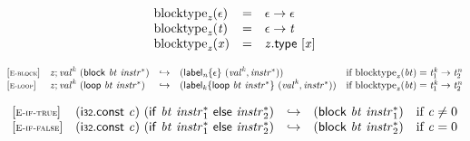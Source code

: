 \vspace{1ex}

$$
\begin{array}{@{}lcl@{}l@{}}
{{\mathrm{blocktype}}}_{{\mathit{z}}}(\epsilon) &=& \epsilon \rightarrow \epsilon &  \\
{{\mathrm{blocktype}}}_{{\mathit{z}}}({\mathit{t}}) &=& \epsilon \rightarrow {\mathit{t}} &  \\
{{\mathrm{blocktype}}}_{{\mathit{z}}}({\mathit{x}}) &=& {\mathit{z}}.\mathsf{type}~{}[{\mathit{x}}] &  \\
\end{array}
$$

$$
\begin{array}{@{}l@{}lcl@{}l@{}}
{[\textsc{\scriptsize E{-}block}]} \quad & {\mathit{z}} ; {{\mathit{val}}^{{\mathit{k}}}}~(\mathsf{block}~{\mathit{bt}}~{{\mathit{instr}}^\ast}) &\hookrightarrow& ({{\mathsf{label}}_{{\mathit{n}}}}{\{\epsilon\}}~({{\mathit{val}}^{{\mathit{k}}}}, {{\mathit{instr}}^\ast})) &\quad
  \mbox{if}~{{\mathrm{blocktype}}}_{{\mathit{z}}}({\mathit{bt}}) = {{\mathit{t}}_{{1}}^{{\mathit{k}}}} \rightarrow {{\mathit{t}}_{{2}}^{{\mathit{n}}}} \\
{[\textsc{\scriptsize E{-}loop}]} \quad & {\mathit{z}} ; {{\mathit{val}}^{{\mathit{k}}}}~(\mathsf{loop}~{\mathit{bt}}~{{\mathit{instr}}^\ast}) &\hookrightarrow& ({{\mathsf{label}}_{{\mathit{k}}}}{\{\mathsf{loop}~{\mathit{bt}}~{{\mathit{instr}}^\ast}\}}~({{\mathit{val}}^{{\mathit{k}}}}, {{\mathit{instr}}^\ast})) &\quad
  \mbox{if}~{{\mathrm{blocktype}}}_{{\mathit{z}}}({\mathit{bt}}) = {{\mathit{t}}_{{1}}^{{\mathit{k}}}} \rightarrow {{\mathit{t}}_{{2}}^{{\mathit{n}}}} \\
\end{array}
$$

$$
\begin{array}{@{}l@{}lcl@{}l@{}}
{[\textsc{\scriptsize E{-}if{-}true}]} \quad & (\mathsf{i{\scriptstyle32}}.\mathsf{const}~{\mathit{c}})~(\mathsf{if}~{\mathit{bt}}~{{\mathit{instr}}_{{1}}^\ast}~\mathsf{else}~{{\mathit{instr}}_{{2}}^\ast}) &\hookrightarrow& (\mathsf{block}~{\mathit{bt}}~{{\mathit{instr}}_{{1}}^\ast}) &\quad
  \mbox{if}~{\mathit{c}} \neq 0 \\
{[\textsc{\scriptsize E{-}if{-}false}]} \quad & (\mathsf{i{\scriptstyle32}}.\mathsf{const}~{\mathit{c}})~(\mathsf{if}~{\mathit{bt}}~{{\mathit{instr}}_{{1}}^\ast}~\mathsf{else}~{{\mathit{instr}}_{{2}}^\ast}) &\hookrightarrow& (\mathsf{block}~{\mathit{bt}}~{{\mathit{instr}}_{{2}}^\ast}) &\quad
  \mbox{if}~{\mathit{c}} = 0 \\
\end{array}
$$

